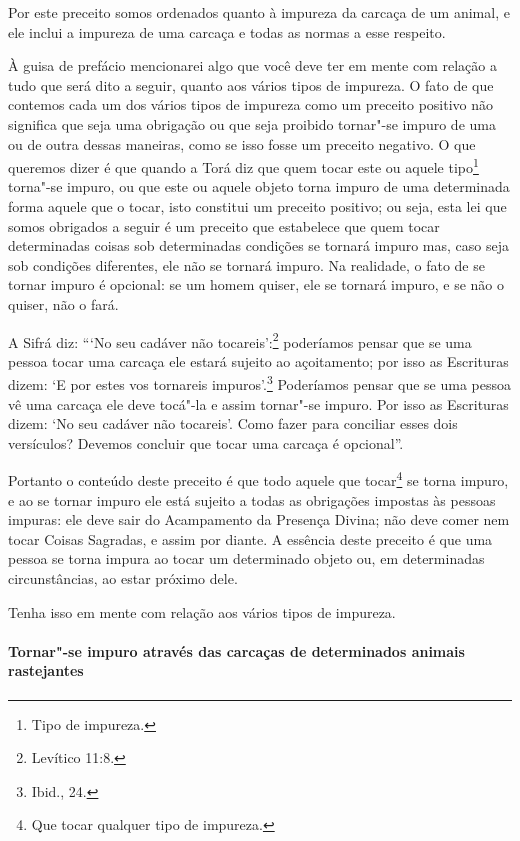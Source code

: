 \begin{multicols}{2}
Por este preceito somos ordenados quanto à impureza da carcaça de um
animal, e ele inclui a impureza de uma carcaça e todas as normas a esse
respeito.

À guisa de prefácio mencionarei algo que você deve ter em mente com
relação a tudo que será dito a seguir, quanto aos vários tipos de
impureza. O fato de que contemos cada um dos vários tipos de impureza
como um preceito positivo não significa que seja uma obrigação ou que
seja proibido tornar"-se impuro de uma ou de outra dessas maneiras, como
se isso fosse um preceito negativo. O que queremos dizer é que quando a
Torá\starr{} diz que quem tocar este ou aquele tipo\footnote{Tipo de impureza.}
torna"-se impuro, ou que este ou aquele objeto torna impuro de uma
determinada forma aquele que o tocar, isto constitui um preceito
positivo; ou seja, esta lei que somos obrigados a seguir é um preceito
que estabelece que quem tocar determinadas coisas sob determinadas
condições se tornará impuro mas, caso seja sob condições diferentes, ele
não se tornará impuro. Na realidade, o fato de se tornar impuro é
opcional: se um homem quiser, ele se tornará impuro, e se não o quiser,
não o fará.

A Sifrá\starr{} diz: ```No seu cadáver não tocareis':\footnote{Levítico 11:8.}
poderíamos pensar que se uma pessoa tocar uma carcaça ele estará
sujeito ao açoitamento; por isso as Escrituras dizem: `E por estes vos
tornareis impuros'.\footnote{Ibid., 24.} Poderíamos pensar que se uma pessoa vê
uma carcaça ele deve tocá"-la e assim tornar"-se impuro. Por isso as
Escrituras dizem: `No seu cadáver não tocareis'. Como fazer para
conciliar esses dois versículos? Devemos concluir que tocar uma carcaça
é opcional''.


Portanto o conteúdo deste preceito é que todo aquele que
tocar\footnote{Que tocar qualquer tipo de impureza.} se torna impuro, e ao se tornar impuro ele
está sujeito a todas as obrigações impostas às pessoas impuras: ele deve
sair do Acampamento da Presença Divina; não deve comer nem tocar Coisas
Sagradas, e assim por diante. A essência deste preceito é que uma pessoa
se torna impura ao tocar um determinado objeto ou, em determinadas
circunstâncias, ao estar próximo dele.

Tenha isso em mente com relação aos vários tipos de impureza.

\paragraph{Tornar"-se impuro através das carcaças de determinados animais rastejantes}


\end{multicols}
